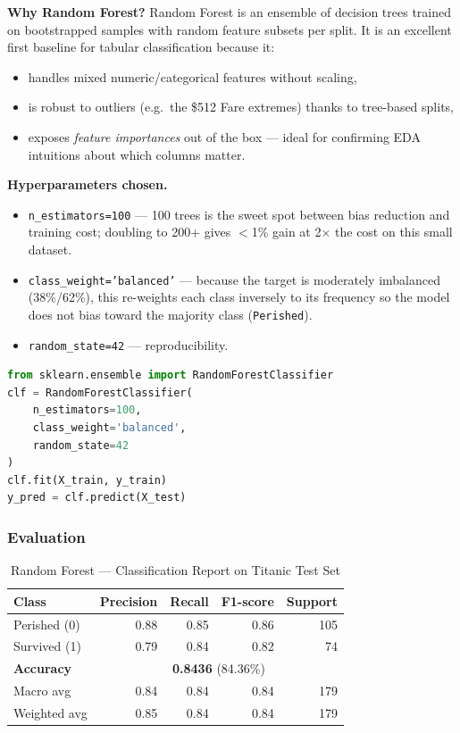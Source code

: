 \textbf{Why Random Forest?} Random Forest is an ensemble of decision trees trained on bootstrapped samples with random feature subsets per split. It is an excellent first baseline for tabular classification because it:
\begin{itemize}
    \item handles mixed numeric/categorical features without scaling,
    \item is robust to outliers (e.g.\ the \$512 Fare extremes) thanks to tree-based splits,
    \item exposes \emph{feature importances} out of the box --- ideal for confirming EDA intuitions about which columns matter.
\end{itemize}

\textbf{Hyperparameters chosen.}
\begin{itemize}
    \item \texttt{n\_estimators=100} --- 100 trees is the sweet spot between bias reduction and training cost; doubling to 200+ gives $<$1\% gain at 2$\times$ the cost on this small dataset.
    \item \texttt{class\_weight='balanced'} --- because the target is moderately imbalanced (38\%/62\%), this re-weights each class inversely to its frequency so the model does not bias toward the majority class (\texttt{Perished}).
    \item \texttt{random\_state=42} --- reproducibility.
\end{itemize}

\begin{lstlisting}[language=Python,caption={Random Forest training.}]
from sklearn.ensemble import RandomForestClassifier
clf = RandomForestClassifier(
    n_estimators=100,
    class_weight='balanced',
    random_state=42
)
clf.fit(X_train, y_train)
y_pred = clf.predict(X_test)
\end{lstlisting}

\subsubsection*{Evaluation}

\begin{table}[H]
\centering
\caption{Random Forest --- Classification Report on Titanic Test Set}
\label{tab:a2_rf_report}
\begin{tabular}{lrrrr}
\hline
\textbf{Class} & \textbf{Precision} & \textbf{Recall} & \textbf{F1-score} & \textbf{Support} \\
\hline
Perished (0) & 0.88 & 0.85 & 0.86 & 105 \\
Survived (1) & 0.79 & 0.84 & 0.82 & 74 \\
\hline
\textbf{Accuracy}   & \multicolumn{4}{c}{\textbf{0.8436} (84.36\%)} \\
Macro avg    & 0.84 & 0.84 & 0.84 & 179 \\
Weighted avg & 0.85 & 0.84 & 0.84 & 179 \\
\hline
\end{tabular}
\end{table}

